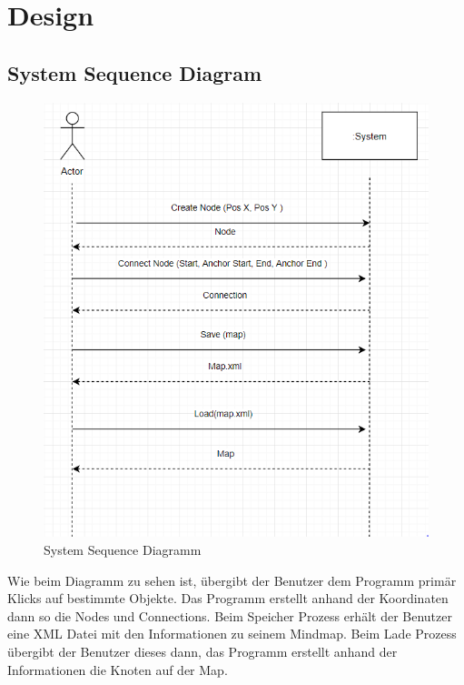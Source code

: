 \chapter{Design}
\label{chap:design}

\section{System Sequence Diagram}
\begin{figure}[H]
	\centering
		\includegraphics[scale=0.7]{images/SSD.png}
	\caption{System Sequence Diagramm}
	\label{fig:domain_model}
\end{figure}
\label{sec:system_sequence_diagram}
Wie beim Diagramm zu sehen ist, übergibt der Benutzer dem Programm primär Klicks auf bestimmte Objekte. Das Programm erstellt anhand der Koordinaten dann so die Nodes und Connections. Beim Speicher Prozess erhält der Benutzer eine XML Datei mit den Informationen zu seinem Mindmap. Beim Lade Prozess übergibt der Benutzer dieses dann, das Programm erstellt anhand der Informationen die Knoten auf der Map.


